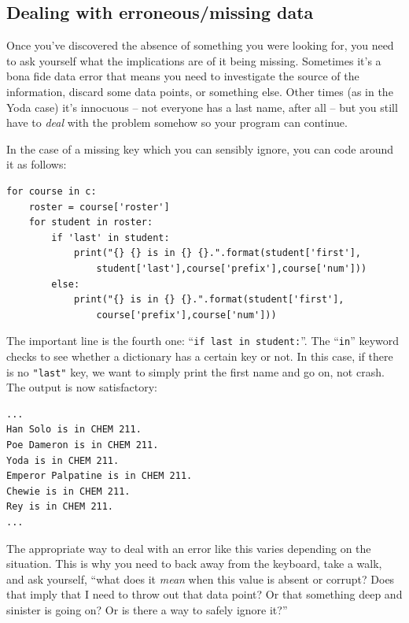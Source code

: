 \subsection{Dealing with erroneous/missing data}

Once you've discovered the absence of something you were looking for, you need
to ask yourself what the implications are of it being missing. Sometimes it's a
bona fide data error that means you need to investigate the source of the
information, discard some data points, or something else. Other times (as in
the Yoda case) it's innocuous -- not everyone has a last name, after all -- but
you still have to \textit{deal} with the problem somehow so your program can
continue.

In the case of a missing key which you can sensibly ignore, you can code around
it as follows:

\begin{Verbatim}[fontsize=\footnotesize,samepage=true,frame=single,framesep=2mm]
for course in c:
    roster = course['roster']
    for student in roster:
        if 'last' in student:
            print("{} {} is in {} {}.".format(student['first'], 
                student['last'],course['prefix'],course['num'])) 
        else:
            print("{} is in {} {}.".format(student['first'], 
                course['prefix'],course['num'])) 
\end{Verbatim}


The important line is the fourth one: ``\texttt{if \textquotesingle
last\textquotesingle~in student:}''. The ``\texttt{in}'' keyword checks to see
whether a dictionary has a certain key or not. In this case, if there is no
\texttt{"last"} key, we want to simply print the first name and go on, not
crash. The output is now satisfactory:

\begin{Verbatim}[fontsize=\small,samepage=true,frame=leftline,framesep=5mm,framerule=1mm]
...
Han Solo is in CHEM 211.
Poe Dameron is in CHEM 211.
Yoda is in CHEM 211.
Emperor Palpatine is in CHEM 211.
Chewie is in CHEM 211.
Rey is in CHEM 211.
...
\end{Verbatim}

The appropriate way to deal with an error like this varies depending on the
situation. This is why you need to back away from the keyboard, take a walk,
and ask yourself, ``what does it \textit{mean} when this value is absent or
corrupt? Does that imply that I need to throw out that data point? Or that
something deep and sinister is going on? Or is there a way to safely ignore
it?''

